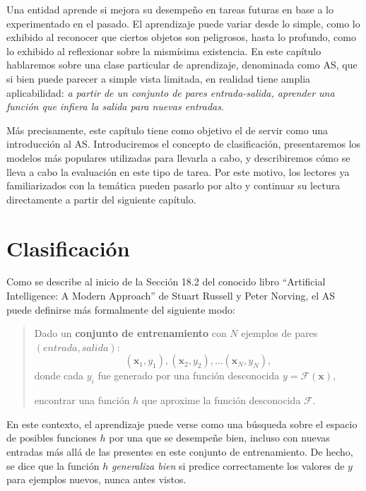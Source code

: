 Una entidad aprende si mejora su desempeño en tareas futuras en base a lo experimentado en el pasado. El aprendizaje puede variar desde lo simple, como lo exhibido al reconocer que ciertos objetos son peligrosos, hasta lo profundo, como lo exhibido al reflexionar sobre la mismísima existencia. En este capítulo hablaremos sobre una clase particular de aprendizaje, denominada como \ac{AS}, que si bien puede parecer a simple vista limitada, en realidad tiene amplia aplicabilidad: \emph{a partir de un conjunto de pares entrada-salida, aprender una función que infiera la salida para nuevas entradas}.

Más precisamente, este capítulo tiene como objetivo el de servir como una introducción al \ac{AS}. Introduciremos  el concepto de clasificación, presentaremos los modelos más populares utilizadas para llevarla a cabo, y describiremos cómo se lleva a cabo la evaluación en este tipo de tarea.
Por este motivo, los lectores ya familiarizados con la temática pueden pasarlo por alto y continuar su lectura directamente a partir del siguiente capítulo.

\section{Clasificación}
\label{sec:clasificacion}

Como se describe al inicio de la Sección 18.2 del conocido libro ``Artificial Intelligence: A Modern Approach'' de Stuart Russell y Peter Norving\cite{RussNorv10}, el \ac{AS} puede definirse más formalmente del siguiente modo:

\begin{quote}
    Dado un \textbf{conjunto de entrenamiento} con $N$ ejemplos de pares $(entrada,salida)$:
    $$(\pmb{x}_1,y_1),(\pmb{x}_2,y_2),\dots(\pmb{x}_N,y_N),$$
    donde cada $y_i$ fue generado por una función desconocida $y=\mathcal{F}(\pmb{x})$,\
    
    encontrar una función $h$ que aproxime la función desconocida $\mathcal{F}$.
\end{quote}

En este contexto, el aprendizaje puede verse como una búsqueda sobre el espacio de posibles funciones $h$ por una que se desempeñe bien, incluso con nuevas entradas más allá de las presentes en este conjunto de entrenamiento.
De hecho, se dice que la función $h$ \emph{generaliza bien} si predice correctamente los valores de $y$ para ejemplos nuevos, nunca antes vistos.

